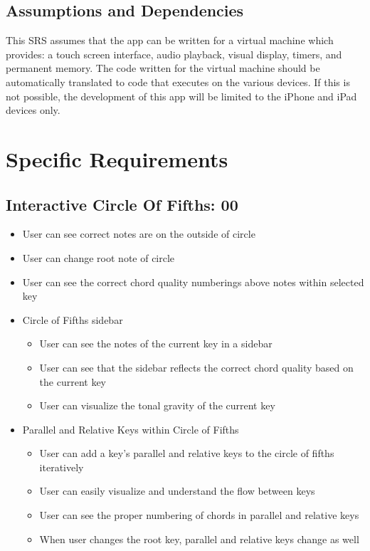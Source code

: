 \documentclass[onecolumn, draftclsnofoot,10pt, compsoc]{IEEEtran}
\begin{document}
\subsection{Assumptions and Dependencies}
\par
This SRS assumes that the app can be written for a virtual machine which provides: a touch screen interface, audio playback, visual display, timers, and permanent memory.
The code written for the virtual machine should be automatically translated to code that executes on the various devices.
If this is not possible, the development of this app will be limited to the iPhone and iPad devices only.

\section{Specific Requirements}

\subsection{Interactive Circle Of Fifths: 00}
\begin{itemize}
\item User can see correct notes are on the outside of circle
\item User can change root note of circle
\item User can see the correct chord quality numberings above notes within selected key
\item Circle of Fifths sidebar
    \begin{itemize}
        \item User can see the notes of the current key in a sidebar
        \item User can see that the sidebar reflects the correct chord quality based on the current key
        \item User can visualize the tonal gravity of the current key
    \end{itemize}
\item Parallel and Relative Keys within Circle of Fifths
    \begin{itemize}
        \item User can add a key’s parallel and relative keys to the circle of fifths iteratively
        \item User can easily visualize and understand the flow between keys
        \item User can see the proper numbering of chords in parallel and relative keys
        \item When user changes the root key, parallel and relative keys change as well
    \end{itemize}
\end{itemize}
\end{document}

